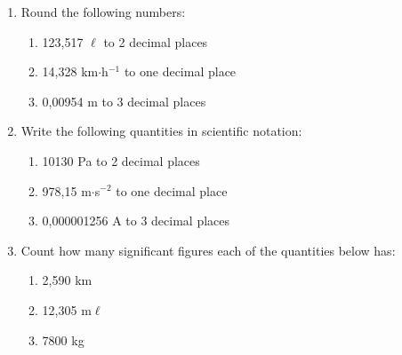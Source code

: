         \label{m30853*id64958}\begin{enumerate}[noitemsep, label=\textbf{\arabic*}. ] 
            \label{m30853*uid20}\item Round the following numbers:
\label{m30853*id64973}\begin{enumerate}[noitemsep, label=\textbf{\alph*}. ] 
            \label{m30853*uid21}\item 123,517 \begin{math}\ell \end{math} to 2 decimal places
\label{m30853*uid22}\item 14,328 km\begin{math}\ensuremath{\cdot}\end{math}h\begin{math}{}^{-1}\end{math} to one decimal place
\label{m30853*uid23}\item 0,00954 m to 3 decimal places
\end{enumerate}
                \label{m30853*uid24}\item Write the following quantities in scientific notation:
\label{m30853*id65060}\begin{enumerate}[noitemsep, label=\textbf{\alph*}. ] 
            \label{m30853*uid25}\item 10130 Pa to 2 decimal places
\label{m30853*uid26}\item 978,15 m\begin{math}\ensuremath{\cdot}\end{math}s\begin{math}{}^{-2}\end{math} to one decimal place
\label{m30853*uid27}\item 0,000001256 A to 3 decimal places
\end{enumerate}
                \label{m30853*uid28}\item Count how many significant figures each of the quantities below has:
\label{m30853*id65139}\begin{enumerate}[noitemsep, label=\textbf{\alph*}. ] 
            \label{m30853*uid29}\item 2,590 km
\label{m30853*uid30}\item 12,305 m\begin{math}\ell \end{math}\label{m30853*uid31}\item 7800 kg
\end{enumerate}
                \end{enumerate}
        
